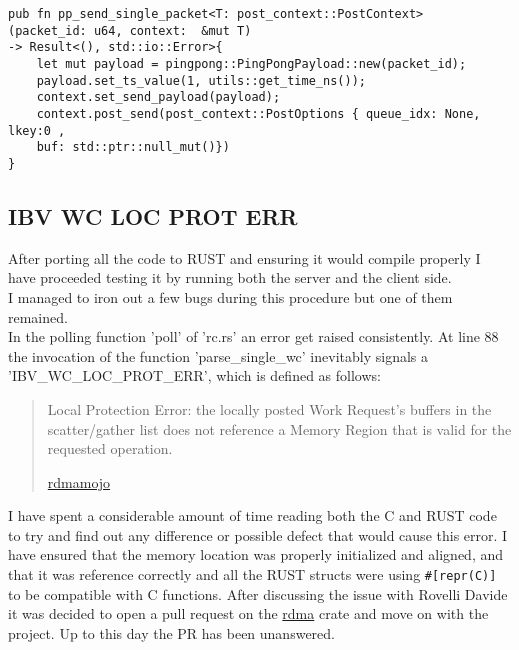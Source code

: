 \documentclass{article}
\begin{document}
\begin{verbatim}
pub fn pp_send_single_packet<T: post_context::PostContext>
(packet_id: u64, context:  &mut T)
-> Result<(), std::io::Error>{
    let mut payload = pingpong::PingPongPayload::new(packet_id);
    payload.set_ts_value(1, utils::get_time_ns());
    context.set_send_payload(payload);
    context.post_send(post_context::PostOptions { queue_idx: None, lkey:0 ,
    buf: std::ptr::null_mut()})
}
\end{verbatim}


\subsection*{IBV WC LOC PROT ERR}
After porting all the code to RUST and ensuring it would compile properly I have proceeded testing it by running both the server and the client side.\\
I managed to iron out a few bugs during this procedure but one of them remained.\\
In the polling function 'poll' of 'rc.rs' an error get raised consistently. At line 88 the invocation of the function 'parse\_single\_wc' inevitably signals a 'IBV\_WC\_LOC\_PROT\_ERR', which is defined as follows:\\
\begin{quote}
   Local Protection Error: the locally posted Work Request’s buffers in the scatter/gather list does not reference a Memory Region that is valid for the requested operation.
  \begin{flushright}
    \tiny{\href{https://www.rdmamojo.com/2013/02/15/ibv_poll_cq/}{rdmamojo}}
  \end{flushright}
\end{quote}

I have spent a considerable amount of time reading both the C and RUST code to try and find out any difference or possible defect that would cause this error. I have ensured that the memory location was properly initialized and aligned, and that it was reference correctly and all the RUST structs were using \texttt{#[repr(C)]} to be compatible with C functions. After discussing the issue with Rovelli Davide it was decided to open a pull request on the \href{https://github.com/Nugine/rdma}{rdma} crate and move on with the project. Up to this day the PR has been unanswered.
\end{document}
